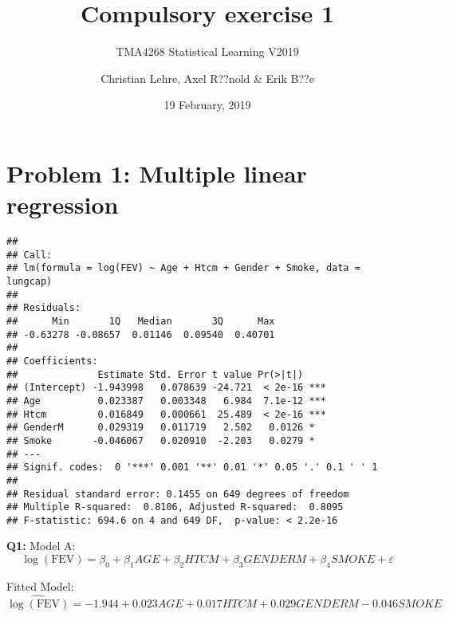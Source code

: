 \documentclass[]{article}
\title{Compulsory exercise 1}
\subtitle{TMA4268 Statistical Learning V2019}
\author{Christian Lehre, Axel R??nold \& Erik B??e}
\date{19 February, 2019}
\newenvironment{Shaded}{\begin{snugshade}}{\end{snugshade}}
\newcommand{\KeywordTok}[1]{\textcolor[rgb]{0.13,0.29,0.53}{\textbf{#1}}}
\newcommand{\DataTypeTok}[1]{\textcolor[rgb]{0.13,0.29,0.53}{#1}}
\newcommand{\FloatTok}[1]{\textcolor[rgb]{0.00,0.00,0.81}{#1}}
\newcommand{\StringTok}[1]{\textcolor[rgb]{0.31,0.60,0.02}{#1}}
\newcommand{\OperatorTok}[1]{\textcolor[rgb]{0.81,0.36,0.00}{\textbf{#1}}}
\newcommand{\NormalTok}[1]{#1}
\begin{document}
\maketitle

\section{Problem 1: Multiple linear
regression}\label{problem-1-multiple-linear-regression}

\begin{Shaded}
\end{Shaded}

\begin{verbatim}
## 
## Call:
## lm(formula = log(FEV) ~ Age + Htcm + Gender + Smoke, data = lungcap)
## 
## Residuals:
##      Min       1Q   Median       3Q      Max 
## -0.63278 -0.08657  0.01146  0.09540  0.40701 
## 
## Coefficients:
##              Estimate Std. Error t value Pr(>|t|)    
## (Intercept) -1.943998   0.078639 -24.721  < 2e-16 ***
## Age          0.023387   0.003348   6.984  7.1e-12 ***
## Htcm         0.016849   0.000661  25.489  < 2e-16 ***
## GenderM      0.029319   0.011719   2.502   0.0126 *  
## Smoke       -0.046067   0.020910  -2.203   0.0279 *  
## ---
## Signif. codes:  0 '***' 0.001 '**' 0.01 '*' 0.05 '.' 0.1 ' ' 1
## 
## Residual standard error: 0.1455 on 649 degrees of freedom
## Multiple R-squared:  0.8106, Adjusted R-squared:  0.8095 
## F-statistic: 694.6 on 4 and 649 DF,  p-value: < 2.2e-16
\end{verbatim}

\textbf{Q1:} \newline
Model A:
\[ \log(\text{FEV}) = \beta_0 + \beta_1AGE + \beta_2HTCM +\beta_3GENDERM  +
\beta_4SMOKE + \varepsilon\]

Fitted Model:
\[ \hat{\log(\text{FEV})} = -1.944 + 0.023AGE + 0.017HTCM + 0.029GENDERM -0.046SMOKE\]
\end{document}
